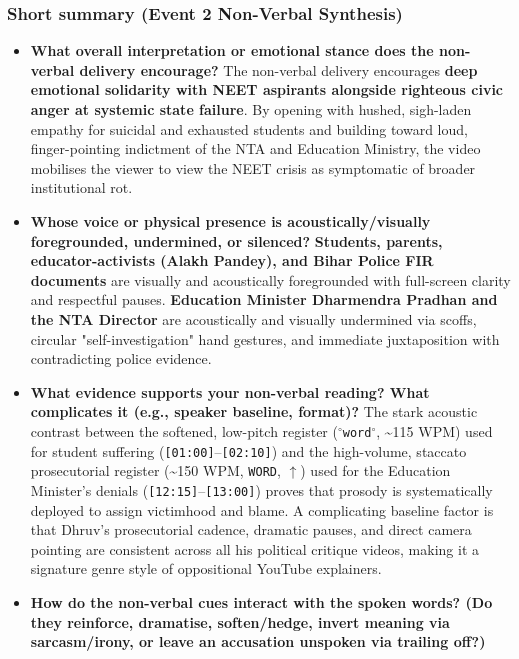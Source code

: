 \documentclass[10pt,a4paper]{article}
\begin{document}
\subsubsection*{Short summary (Event 2 Non-Verbal Synthesis)}

\begin{itemize}
  \item \textbf{What overall interpretation or emotional stance does the non-verbal delivery encourage?}
The non-verbal delivery encourages \textbf{deep emotional solidarity with NEET aspirants alongside righteous civic anger at systemic state failure}. By opening with hushed, sigh-laden empathy for suicidal and exhausted students and building toward loud, finger-pointing indictment of the NTA and Education Ministry, the video mobilises the viewer to view the NEET crisis as symptomatic of broader institutional rot.\par\smallskip
  \item \textbf{Whose voice or physical presence is acoustically/visually foregrounded, undermined, or silenced?}
\textbf{Students, parents, educator-activists (Alakh Pandey), and Bihar Police FIR documents} are visually and acoustically foregrounded with full-screen clarity and respectful pauses. \textbf{Education Minister Dharmendra Pradhan and the NTA Director} are acoustically and visually undermined via scoffs, circular "self-investigation" hand gestures, and immediate juxtaposition with contradicting police evidence.\par\smallskip
  \item \textbf{What evidence supports your non-verbal reading? What complicates it (e.g., speaker baseline, format)?}
The stark acoustic contrast between the softened, low-pitch register (\texttt{$^\circ$word$^\circ$}, \textasciitilde{}115 WPM) used for student suffering (\texttt{[01:00]}--\texttt{[02:10]}) and the high-volume, staccato prosecutorial register (\textasciitilde{}150 WPM, \texttt{WORD}, \texttt{$\uparrow$}) used for the Education Minister's denials (\texttt{[12:15]}--\texttt{[13:00]}) proves that prosody is systematically deployed to assign victimhood and blame. A complicating baseline factor is that Dhruv's prosecutorial cadence, dramatic pauses, and direct camera pointing are consistent across all his political critique videos, making it a signature genre style of oppositional YouTube explainers.\par\smallskip
  \item \textbf{How do the non-verbal cues interact with the spoken words? (Do they reinforce, dramatise, soften/hedge, invert meaning via sarcasm/irony, or leave an accusation unspoken via trailing off?)}

\end{itemize}
\end{document}
